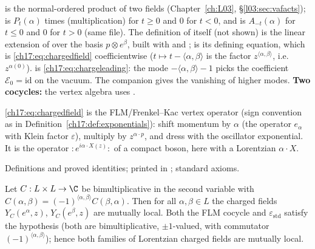 \begin{dictionary}
 is the normal-ordered product of two fields (Chapter~\ref{ch:L03}, \S\ref{l03:sec:vafacts});
 is $P_t(\alpha)$ times (multiplication) for $t\ge0$ and $0$ for $t<0$, and
 is $A_{-t}(\alpha)$ for $t\le0$ and $0$ for $t>0$ (same file).  The definition of
 itself (not shown) is the linear extension of  over the basis
$p\otimes e^\beta$, built with  and ;  is
its defining equation, which is \eqref{ch17:eq:chargedfield} coefficientwise ($t\mapsto t-\langle\alpha,\beta\rangle$ is
the factor $z^{\langle\alpha,\beta\rangle}$, i.e.\ $z^{\alpha(0)}$).   is
\eqref{ch17:eq:chargeleading}: the mode $-\langle\alpha,\beta\rangle-1$ picks the coefficient $\mathcal E_0=\mathrm{id}$ on the
vacuum.  The companion  gives the vanishing of higher modes.
\textbf{Two cocycles:} the vertex algebra uses .
\end{dictionary}

\begin{physics}
\eqref{ch17:eq:chargedfield} is the FLM/Frenkel--Kac vertex operator (sign convention as in
Definition~\ref{ch17:def:exponentials}): shift momentum by $\alpha$ (the operator $e_\alpha$ with Klein
factor $\varepsilon$), multiply by $z^{\alpha\cdot p}$, and dress with the oscillator exponential.  It is the operator
${:}e^{i\alpha\cdot X(z)}{:}$ of a compact boson, here with a Lorentzian $\alpha\cdot X$.
\end{physics}

\begin{status}
Definitions and proved identities; printed in ; standard axioms.
\end{status}

\begin{theorem}\label{ch17:thm:chargedlocal}
Let $C:L\times L\to\C$ be bimultiplicative in the second variable with $C(\alpha,\beta)=(-1)^{\langle\alpha,\beta\rangle}C(\beta,\alpha)$.
Then for all $\alpha,\beta\in L$ the charged fields $Y_C(e^\alpha,z)$, $Y_C(e^\beta,z)$ are mutually local.  Both the
FLM cocycle and $\varepsilon_{\mathrm{std}}$ satisfy the hypothesis (both are bimultiplicative, $\pm1$-valued, with
commutator $(-1)^{\langle\alpha,\beta\rangle}$); hence both families of Lorentzian charged
fields are mutually local.
\end{theorem}

